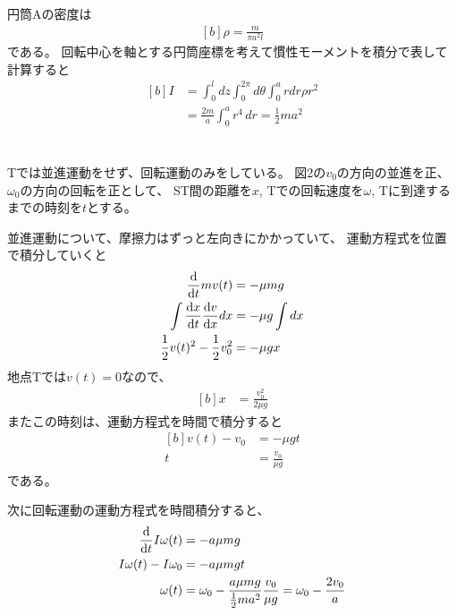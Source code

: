 \documentclass[../ap_2013.tex]{subfiles}
\begin{document}
\section{}
円筒Aの密度は
\begin{equation}\begin{aligned}[b]
    \rho = \frac{m}{\pi a^2l}
\end{aligned}\end{equation}
である。
回転中心を軸とする円筒座標を考えて慣性モーメントを積分で表して計算すると
\begin{equation}\begin{aligned}[b]
    I &= \int_0^l dz\int_0^{2\pi} d\theta \int_0^a rdr \rho r^2\\
    &= \frac{2m}{a}\int_0^a r^4\,dr = \frac{1}{2}ma^2
\end{aligned}\end{equation}

\section{}
Tでは並進運動をせず、回転運動のみをしている。
図2の\(v_0\)の方向の並進を正、\(\omega_0\)の方向の回転を正として、
ST間の距離を\(x\), Tでの回転速度を\(\omega\), Tに到達するまでの時刻を\(t\)とする。

並進運動について、摩擦力はずっと左向きにかかっていて、
運動方程式を位置で積分していくと
\begin{equation}\begin{aligned}[b]
    \dv{t}mv(t) &= -\mu mg\\
    \int \dv{x}{t}\dv{v}{x}dx &= -\mu g\int dx\\
    \frac{1}{2}v(t)^2-\frac{1}{2}v_0^2 &= -\mu gx
\end{aligned}\end{equation}
地点Tでは\(v(t)=0\)なので、
\begin{equation}\begin{aligned}[b]
    x &= \frac{v_0^2}{2\mu g}
\end{aligned}\end{equation}
またこの時刻は、運動方程式を時間で積分すると
\begin{equation}\begin{aligned}[b]
    v(t) -v_0 &= -\mu gt\\
    t &= \frac{v_0}{\mu g}
\end{aligned}\end{equation}
である。

次に回転運動の運動方程式を時間積分すると、
\begin{equation}\begin{aligned}[b]
    \dv{t}I\omega(t) &= -a\mu mg\\
    I\omega(t)-I\omega_0 &= -a\mu mgt\\
    \omega(t) &= \omega_0 -\frac{a \mu mg}{\frac{1}{2}ma^2}\frac{v_0}{\mu g} = \omega_0 -\frac{2v_0}{a}
\end{aligned}\end{equation}
\end{document}
